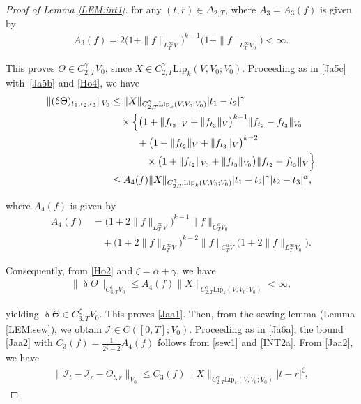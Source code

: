\documentclass[letterpaper, 11pt,  reqno]{amsart}
\newcommand{\1}{\hspace{0.5mm}\text{I}\hspace{0.5mm}}
\newcommand{\I}{\mathcal{I}}
\newcommand{\noi}{\noindent}
\newcommand{\al}{\alpha}
\newcommand{\updl}{\updelta}
\newcommand{\Dl}{\Delta}
\newcommand{\g}{\gamma}
\newcommand{\Lip}{\mathrm{Lip}}
\newcommand{\z}{\zeta}
\numberwithin{equation}{section}
\numberwithin{theorem}{section}
\begin{document}
\begin{proof}[Proof of Lemma \ref{LEM:int1}]
\noi
for any $(t,r)\in\Dl_{2,T}$, 
where $A_3= A_3(f)$ is given by 
\begin{align*}
A_3(f)
= 2\big(1 + \|f\|_{ L^\infty_TV}\big)^{k-1} 
\big(1 + \|f\|_{ L^\infty_T V_0} \big)
<\infty. 
\end{align*}




\noi
This proves 
$\Theta\in C^\g_{2,T} V_0$, 
since $X\in C^\g_{2,T}\Lip_k(V, V_0; V_0)$. 
Proceeding as in \eqref{Ja5c} with~\eqref{Ja5b} and \eqref{Ho4}, we have 
\begin{align*}
\| (\updl \Theta)_{t_1,t_2,t_3}\|_{ V_0}
& \leq \|X\|_{C^\g_{2,T}\Lip_k(V, V_0;V_0)} |t_1-t_2|^\g \notag \\
&\quad \times
\Big\{\big(1+\|f_{t_2}\|_{ V} + \|f_{t_3}\|_{ V}\big)^{k-1}
\|f_{t_2}-f_{t_3}\|_{ V_0} \notag \\
& \hphantom{XXX}+ \big(1+\|f_{t_2}\|_{ V} + \|f_{t_3}\|_{ V}\big)^{k-2} 
\\
& \hphantom{XXXX} \times \big(1+\|f_{t_2}\|_{ V_0} + \|f_{t_3}\|_{ V_0}\big)
\|f_{t_2}-f_{t_3}\|_{ V} \Big\}\notag \\
& \leq A_4(f) \|X\|_{C^\g_{2,T}\Lip_k(V, V_0; V_0)} |t_1-t_2|^\g 
|t_2 - t_3|^{\al} , \notag 
\end{align*}

\noi
where $A_4 (f)$ is given by 
\begin{align*}
A_4(f)
&= 
\big(1+ 2\|f\|_{L^\infty_T V} \big)^{k-1} \|f\|_{C^\al_T  V_0}\\
& \quad + \big(1+ 2\|f\|_{L^\infty_T V} \big)^{k-2} \|f\|_{C^\al_T  V}
\big(1+ 2\|f\|_{L^\infty_T V_0} \big).
\end{align*}



\noi
Consequently, 
from \eqref{Ho2}
and $\z = \al + \g$, 
we have 
\begin{align}
\label{INT2a}
\|\updl \Theta\|_{C^\z_{3,T} V_0}
\leq A_4(f)
\|X\|_{C^\g_{2,T}\Lip_k(V, V_0; V_0)}
<\infty,
\end{align}


\noi
yielding 
 $\updl \Theta \in C^\z_{3,T}  V_0$.
This proves \eqref{Jaa1}.
Then, from 
 the sewing lemma (Lemma \ref{LEM:sew}), 
 we obtain $\I\in C([0,T]; V_0)$. 
Proceeding as in \eqref{Ja6a}, 
the bound \eqref{Jaa2}
with $C_3(f)  = \frac{1}{2^\z -2} A_4(f)$
follows from \eqref{sew1} and \eqref{INT2a}.
From 
\eqref{Jaa2}, we have 
\begin{align}
\label{Jaa7}
\|\I_t - \I_r - \Theta_{t,r}\|_{ V_0}
\leq C_3(f)
\|X\|_{C^\g_{2,T}\Lip_k(V, V_0;V_0)}|t-r|^{\z},
\end{align}


\end{proof}
\end{document}
